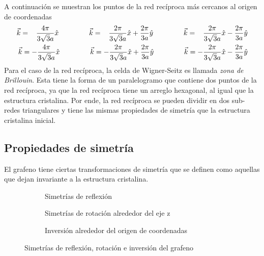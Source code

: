 A continuación se muestran los puntos de la red recíproca más cercanos al origen de coordenadas
\begin{equation}
  \begin{aligned}[b]
    \vec{k} = \hspace{0.3cm}\frac{4\pi}{3\sqrt{3}a}\hat{x}\hspace{1.5cm} \vec{k} = \hspace{0.3cm}\frac{2\pi}{3\sqrt{3}a} \hat{x}+ \frac{2\pi}{3a} \hat{y} \hspace{1.5cm} \vec{k} = \hspace{0.3cm}\frac{2\pi}{3\sqrt{3}a} \hat{x} -\frac{2\pi}{3a} \hat{y}                                                                          \\
	\vec{k} = -\frac{4\pi}{3\sqrt{3}a}\hat{x}  \hspace{1.5cm} \vec{k} = -\frac{2\pi}{3\sqrt{3}a} \hat{x}+\frac{2\pi}{3a} \hat{y} \hspace{1.5cm} \vec{k} = -\frac{2\pi}{3\sqrt{3}a} \hat{x}-\frac{2\pi}{3a} \hat{y}
\end{aligned}
\end{equation}
Para el caso de la red recíproca, la celda de Wigner-Seitz es llamada \emph{zona de Brillouin}. Esta tiene la forma de un paralelogramo que contiene dos puntos de la red recíproca, ya que la red recíproca tiene un arreglo hexagonal, al igual que la estructura cristalina. Por ende, la red recíproca se pueden dividir en dos sub-redes triangulares y tiene las mismas propiedades de simetría que la estructura cristalina inicial.
\subsection{Propiedades de simetría}
El grafeno tiene ciertas transformaciones de simetría que se definen como aquellas que dejan invariante a la estructura cristalina. 
\begin{figure}[!httb]
    \centering
    \begin{subfigure}[b]{0.3\linewidth}
        \centering
        
        \caption{Simetrías de reflexión\\\hfill}
        \label{fig:twofold}
    \end{subfigure}
    \hfill
    \begin{subfigure}[b]{0.3\linewidth}
        \centering
        
        \caption{Simetrías de rotación alrededor del eje z}
        \label{fig:rotation}
    \end{subfigure}
    \hfill
    \begin{subfigure}[b]{0.3\linewidth}
        \centering
        
        \caption{Inversión alrededor del origen de coordenadas}
        \label{fig:inversion}
    \end{subfigure}
    \caption{Simetrías de reflexión, rotación e inversión del grafeno}
\end{figure}

